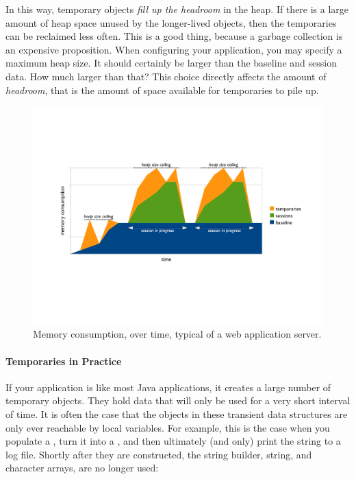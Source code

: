 In this way, temporary objects \emph{fill up the headroom} in the
heap. If there is a large amount of heap space unused by the
longer-lived objects, then the temporaries can be reclaimed less often. This is a
good thing, because a garbage collection is an expensive proposition.    When
configuring your application, you may specify a maximum heap size. It should
certainly be larger than the baseline and session data. How much larger than
that? This choice directly affects the amount of \emph{headroom}, that is the
amount of space available for temporaries to pile up.

\begin{figure}
	\centering
	\includegraphics[width=\textwidth]{part2/Figures/lifetime/timeline-base-session-temps}
	\caption{Memory consumption, over time, typical of a web application server.}
	\label{fig:timeline-base-session-temps}
\end{figure}

\paragraph{Temporaries in Practice}
If your application is like most Java applications, it creates a large number of
temporary objects. They hold data that will only be used for a very short
interval of time. It is often the case that the objects in these transient data
structures are only ever reachable by local variables. For example, this is the
case when you populate a , turn it into a ,
and then ultimately (and only) print the string to a log file. Shortly after
they are constructed, the string builder, string, and character arrays, are no
longer used:

